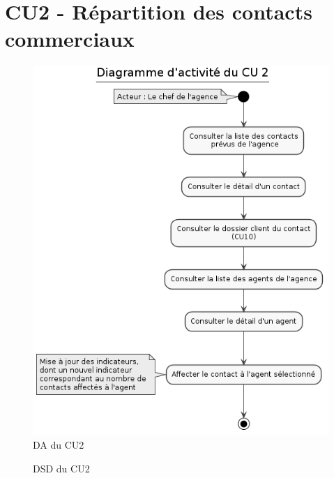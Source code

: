 \clearpage
\section{CU2 - Répartition des contacts commerciaux}

\begin{figure}[H]
\centering
\includegraphics[width=\textwidth]{figures/DA_CU2.png}
\caption{DA du CU2}
\end{figure}


\begin{figure}[H]
\noindent{}
\caption{DSD du CU2}
\end{figure}


